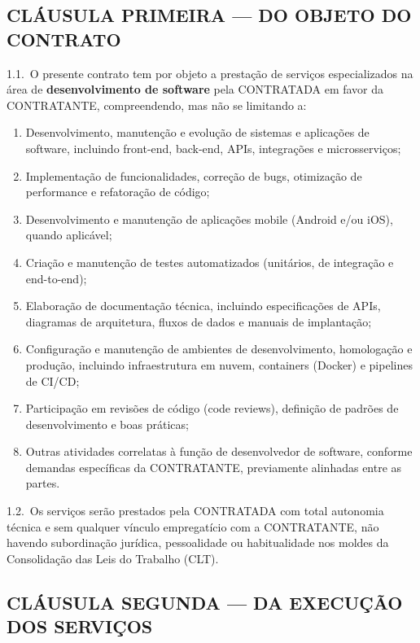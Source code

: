 \documentclass[11pt, a4paper]{article}
\begin{document}
\subsection{CLÁUSULA PRIMEIRA — DO OBJETO DO CONTRATO}

1.1.\ O presente contrato tem por objeto a prestação de serviços especializados na área de \textbf{desenvolvimento de software} pela CONTRATADA em favor da CONTRATANTE, compreendendo, mas não se limitando a:

\begin{enumerate}[label=\alph*), leftmargin=1.8em]
    \item Desenvolvimento, manutenção e evolução de sistemas e aplicações de software, incluindo front-end, back-end, APIs, integrações e microsserviços;
    \item Implementação de funcionalidades, correção de bugs, otimização de performance e refatoração de código;
    \item Desenvolvimento e manutenção de aplicações mobile (Android e/ou iOS), quando aplicável;
    \item Criação e manutenção de testes automatizados (unitários, de integração e end-to-end);
    \item Elaboração de documentação técnica, incluindo especificações de APIs, diagramas de arquitetura, fluxos de dados e manuais de implantação;
    \item Configuração e manutenção de ambientes de desenvolvimento, homologação e produção, incluindo infraestrutura em nuvem, containers (Docker) e pipelines de CI/CD;
    \item Participação em revisões de código (code reviews), definição de padrões de desenvolvimento e boas práticas;
    \item Outras atividades correlatas à função de desenvolvedor de software, conforme demandas específicas da CONTRATANTE, previamente alinhadas entre as partes.
\end{enumerate}

1.2.\ Os serviços serão prestados pela CONTRATADA com total autonomia técnica e sem qualquer vínculo empregatício com a CONTRATANTE, não havendo subordinação jurídica, pessoalidade ou habitualidade nos moldes da Consolidação das Leis do Trabalho (CLT).

\subsection{CLÁUSULA SEGUNDA — DA EXECUÇÃO DOS SERVIÇOS}
\end{document}
